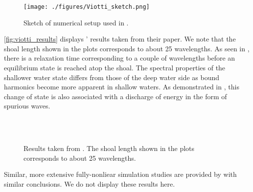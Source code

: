 \documentclass[internal]{sintefmemo}
\begin{document}
\begin{figure}[h!pbt]%
\centering
\texttt{[image: ./figures/Viotti\_sketch.png]}%
\caption{Sketch of numerical setup used in \citet{viotti_2014_slope}.}%
\label{fig:Viotti_sketch}%
\end{figure}

\autoref{fig:viotti_results} displays \citeauthor{viotti_2014_slope}' results taken from their paper.
We note that the shoal length shown in the plots corresponds to about 25 wavelengths.
As seen in \citet{trulsen_2020_rampKurtosis}, there is a relaxation time corresponding to a couple of wavelengths before an equilibrium state is reached atop the shoal. 
The spectral properties of the shallower water state differs from those of the deep water side as bound harmonics become more apparent in shallow waters. 
As demonstrated in \citet{li_2021_step1,li_2021_step2}, this change of state is also associated with a discharge of energy in the form of spurious waves. 


\begin{figure}[h!ptb]%
\centering
\subfloat[Characteristic local frequency, wavenumber, skewness and excess of kurtosis for the four shoal heights.]{%
\texttt{[image: ./figures/Viotti\_k.png]}\texttt{[image: ./figures/Viotti\_kurtosis.png]}%
}\\
\\
\caption{Results taken from \citet{viotti_2014_slope}.
The shoal length shown in the plots corresponds to about 25 wavelengths.}%
\label{fig:viotti_results}%
\end{figure}

Similar, more extensive fully-nonliear simulation studies are provided by \citet{Zheng_2020_slope} with similar conclusions. We do not display these results here.
\end{document}

